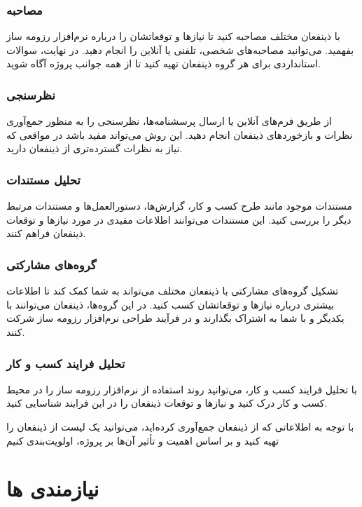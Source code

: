 \documentclass[]{article}
\begin{document}
	
	\subsubsection{\Large{مصاحبه}}
	با ذینفعان مختلف مصاحبه کنید تا نیازها و توقعاتشان را درباره نرم‌افزار رزومه ساز بفهمید. می‌توانید مصاحبه‌های شخصی، تلفنی یا آنلاین را انجام دهید. در نهایت، سوالات استانداردی برای هر گروه ذینفعان تهیه کنید تا از همه جوانب پروژه آگاه شوید.
	
	\subsubsection{\Large{نظرسنجی}}
	از طریق فرم‌های آنلاین یا ارسال پرسشنامه‌ها، نظرسنجی را به منظور جمع‌آوری نظرات و بازخوردهای ذینفعان انجام دهید. این روش می‌تواند مفید باشد در مواقعی که نیاز به نظرات گسترده‌تری از ذینفعان دارید.
	
	
	\subsubsection{\Large{تحلیل مستندات}}
	مستندات موجود مانند طرح کسب و کار، گزارش‌ها، دستورالعمل‌ها و مستندات مرتبط دیگر را بررسی کنید. این مستندات می‌توانند اطلاعات مفیدی در مورد نیازها و توقعات ذینفعان فراهم کنند.
	
	
	\subsubsection{\Large{گروه‌های مشارکتی}}
	تشکیل گروه‌های مشارکتی با ذینفعان مختلف می‌تواند به شما کمک کند تا اطلاعات بیشتری درباره نیازها و توقعاتشان کسب کنید. در این گروه‌ها، ذینفعان می‌توانند با یکدیگر و با شما به اشتراک بگذارند و در فرآیند طراحی نرم‌افزار رزومه ساز شرکت کنند.
	
	\subsubsection{\Large{تحلیل فرایند کسب و کار}}
	با تحلیل فرایند کسب و کار، می‌توانید روند استفاده از نرم‌افزار رزومه ساز را در محیط کسب و کار درک کنید و نیازها و توقعات ذینفعان را در این فرایند شناسایی کنید.
	
	
	
	با توجه به اطلاعاتی که از ذینفعان جمع‌آوری کرده‌اید، می‌توانید یک لیست از ذینفعان را تهیه کنید و بر اساس اهمیت و تأثیر آن‌ها بر پروژه، اولویت‌بندی کنیم
	
	
	\section{\huge{نیازمندی ها}}
\end{document}
